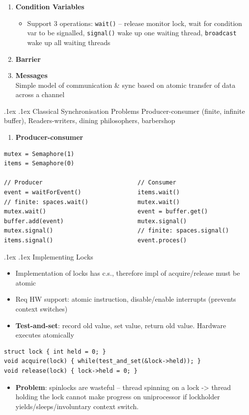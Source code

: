\documentclass[10pt,landscape,a4paper]{article}
\makeatletter
\renewcommand{\subsection}{\@startsection{subsection}{1}{0mm}%
  {.1ex}%
  {.1ex}%
{\sffamily\bfseries}}
\renewcommand{\subsubsection}{\@startsection{subsubsection}{1}{0mm}%
  {.1ex}%
  {.1ex}%
{\rmfamily\bfseries}}
\makeatother
\begin{document}
\begin{multicols*}{4}
\begin{enumerate}
\begin{itemize}
    \end{itemize}
    \item \textbf{Condition Variables}
    \begin{itemize}
      \item Support 3 operations: \texttt{wait()} -- release monitor lock, wait for condition var to be signalled, \texttt{signal()} wake up one waiting thread, \texttt{broadcast} wake up all waiting threads
    \end{itemize}
    \item \textbf{Barrier}
    \item \textbf{Messages}\\
    Simple model of communication \& sync based on atomic transfer of data across a channel
  \end{enumerate}
  \subsubsection{Classical Synchronisation Problems}
  Producer-consumer (finite, infinite buffer), Readers-writers, dining philosophers, barbershop
  \begin{enumerate}
    \item \textbf{Producer-consumer}
  \end{enumerate}
\begin{verbatim}
mutex = Semaphore(1)
items = Semaphore(0)

// Producer                           // Consumer
event = waitForEvent()                items.wait()
// finite: spaces.wait()              mutex.wait()
mutex.wait()                          event = buffer.get()
buffer.add(event)                     mutex.signal()
mutex.signal()                        // finite: spaces.signal()
items.signal()                        event.proces()
\end{verbatim}
  \subsection{Implementing Locks}
  \begin{itemize}
    \item Implementation of locks has c.s., therefore impl of acquire/release must be atomic
    \item Req HW support: atomic instruction, disable/enable interrupts (prevents context switches)
    \item \textbf{Test-and-set}: record old value, set value, return old value. Hardware executes atomically
  \end{itemize}
  \begin{verbatim}
struct lock { int held = 0; }
void acquire(lock) { while(test_and_set(&lock->held)); }
void release(lock) { lock->held = 0; }
  \end{verbatim}
  \begin{itemize}
    \item \textbf{Problem}: spinlocks are wasteful -- thread spinning on a lock -> thread holding the lock cannot make progress on uniprocessor if lockholder yields/sleeps/involuntary context switch.
  \end{itemize}

\end{multicols*}
\end{document}
